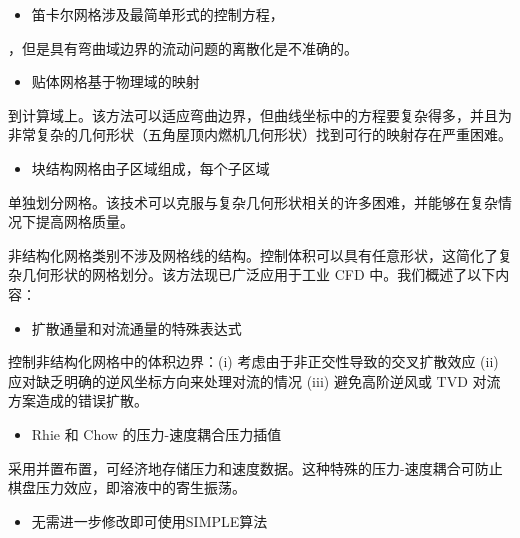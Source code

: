 \documentclass[11pt,a4paper,openany,fontset=none]{ctexbook}
\begin{document}
\begin{itemize}

\item 笛卡尔网格涉及最简单形式的控制方程，

\end{itemize}

，但是具有弯曲域边界的流动问题的离散化是不准确的。

\begin{itemize}

\item 贴体网格基于物理域的映射

\end{itemize}

到计算域上。该方法可以适应弯曲边界，但曲线坐标中的方程要复杂得多，并且为非常复杂的几何形状（五角屋顶内燃机几何形状）找到可行的映射存在严重困难。

\begin{itemize}

\item 块结构网格由子区域组成，每个子区域

\end{itemize}

单独划分网格。该技术可以克服与复杂几何形状相关的许多困难，并能够在复杂情况下提高网格质量。

非结构化网格类别不涉及网格线的结构。控制体积可以具有任意形状，这简化了复杂几何形状的网格划分。该方法现已广泛应用于工业 CFD 中。我们概述了以下内容：

\begin{itemize}

\item 扩散通量和对流通量的特殊表达式

\end{itemize}

控制非结构化网格中的体积边界：(i) 考虑由于非正交性导致的交叉扩散效应 (ii) 应对缺乏明确的逆风坐标方向来处理对流的情况 (iii) 避免高阶逆风或 TVD 对流方案造成的错误扩散。

\begin{itemize}

\item Rhie 和 Chow 的压力-速度耦合压力插值

\end{itemize}

采用并置布置，可经济地存储压力和速度数据。这种特殊的压力-速度耦合可防止棋盘压力效应，即溶液中的寄生振荡。

\begin{itemize}

\item 无需进一步修改即可使用SIMPLE算法

\end{itemize}
\end{document}

